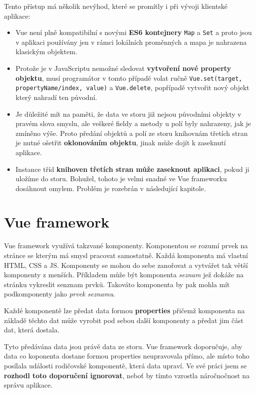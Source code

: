 Tento přístup má několik nevýhod, které se promítly i při vývoji klientské aplikace:
\begin{itemize}
  \item Vue není plně kompatibilní s novými \textbf{ES6 kontejnery} \texttt{Map} a \texttt{Set} a proto jsou v aplikaci používány jen v rámci lokálních proměnných a mapa je nahrazena klasickým objektem.
  \item Protože je v JavaScriptu nemožné sledovat \textbf{vytvoření nové property objektu}, musí programátor v tomto případě volat ručně \texttt{Vue.set(target, propertyName/index, value)} a \texttt{Vue.delete}, popřípadě vytvořit nový objekt který nahradí ten původní.
  \item Je důležité mít na paměti, že data ve storu již nejsou původními objekty v pravém slova smyslu, ale veškeré fieldy a metody u polí byly nahrazeny, jak je zmíněno výše. Proto předání objektů a polí ze storu knihovnám třetích stran je nutné ošetřit \textbf{oklonováním objektu}, jinak může dojít k zaseknutí aplikace.
  \item Instance tříd \textbf{knihoven třetích stran může zaseknout aplikaci}, pokud ji uložíme do storu. Bohužel, tohoto je velmi snadné ve Vue frameworku dosáhnout omylem. Problém je rozebrán v následující kapitole.
\end{itemize}

\section{Vue framework}
Vue framework využívá takzvané komponenty. Komponentou se rozumí prvek na stránce se kterým má smysl pracovat samostatně. Každá komponenta má vlastní HTML, CSS a JS. Komponenty se mohou do sebe zanořovat a vytvářet tak větší komponenty z menších. Příkladem může být komponenta \textit{seznam} jež dokáže na stránku vykreslit senznam prvků. Takováto komponenta by pak mohla mít podkomponenty jako \textit{prvek seznamu}.

Každé komponentě lze předat data formou \textbf{properties} přičemž komponenta na základě těchto dat může vyrobit pod sebou další komponenty a předat jim část dat, která dostala.

Tyto předávána data jsou právě data ze storu. Vue framework doporučuje, aby data co koponenta dostane formou properties neupravovala přímo, ale místo toho posílala události rodičovské komponentě, která data upraví. Ve své práci jsem se \textbf{rozhodl toto doporučení ignorovat}, neboť by tímto vzrostla náročnočnost na správu aplikace.

